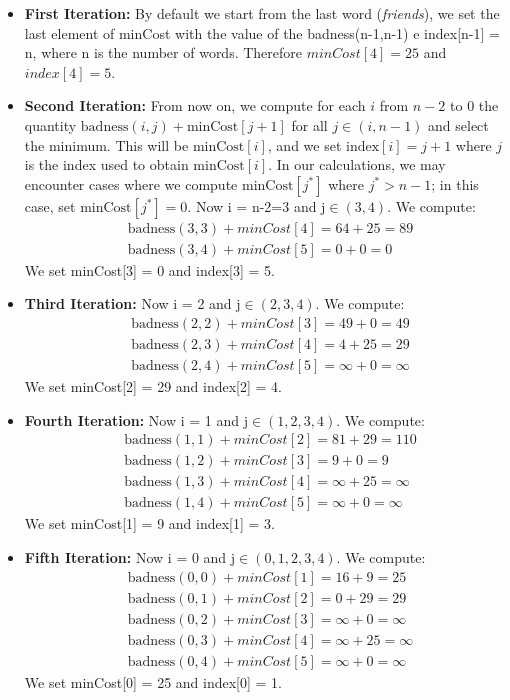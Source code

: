\begin{itemize}
    \item \textbf{First Iteration:} By default we start from the last word (\textit{friends}), we set the last element of minCost with the value of the badness(n-1,n-1) e index[n-1] = n, where n is the number of words. Therefore $minCost[4] = 25$ and $index[4] = 5$. 
    \item \textbf{Second Iteration:} From now on, we compute for each $i$ from $n-2$ to 0 the quantity $\text{badness}(i,j) + \text{minCost}[j+1]$ for all $j \in (i, n-1)$ and select the minimum. This will be $\text{minCost}[i]$, and we set $\text{index}[i] = j+1$ where $j$ is the index used to obtain $\text{minCost}[i]$. In our calculations, we may encounter cases where we compute $\text{minCost}[j^*]$ where $j^* > n-1$; in this case, set $\text{minCost}[j^*] = 0$. \newline
    Now i = n-2=3 and j$\in (3,4)$. We compute:
    \begin{align*}
         &\text{badness}(3,3) + minCost[4] = 64 + 25 = 89 \\
         &\text{badness}(3,4) + minCost[5] = 0 + 0   = 0
    \end{align*}
    We set minCost[3] = 0 and index[3] = 5. 
    \item \textbf{Third Iteration:} Now i = 2 and j$\in (2,3,4)$. We compute:
    \begin{align*}
        &\text{badness}(2,2) + minCost[3] = 49 + 0 = 49 \\
        &\text{badness}(2,3) + minCost[4] = 4 + 25 = 29 \\
        &\text{badness}(2,4) + minCost[5] = \infty + 0 = \infty
    \end{align*}
    We set minCost[2] = 29 and index[2] = 4. 
    \item \textbf{Fourth Iteration:} Now i = 1 and j$\in (1,2,3,4)$. We compute:
    \begin{align*}
        &\text{badness}(1,1) + minCost[2] = 81 + 29 = 110 \\
        &\text{badness}(1,2) + minCost[3] = 9 + 0 = 9 \\
        &\text{badness}(1,3) + minCost[4] = \infty + 25= \infty \\
        &\text{badness}(1,4) + minCost[5] = \infty + 0 = \infty
    \end{align*}
    We set minCost[1] = 9 and index[1] = 3. 
    \item \textbf{Fifth Iteration:} Now i = 0 and j$\in (0,1,2,3,4)$. We compute:
    \begin{align*}
        &\text{badness}(0,0) + minCost[1] = 16 + 9 = 25 \\
        &\text{badness}(0,1) + minCost[2] = 0 + 29 = 29 \\
        &\text{badness}(0,2) + minCost[3] = \infty + 0 = \infty \\
        &\text{badness}(0,3) + minCost[4] = \infty + 25= \infty \\
        &\text{badness}(0,4) + minCost[5] = \infty + 0 = \infty
    \end{align*}
    We set minCost[0] = 25 and index[0] = 1.
\end{itemize}

